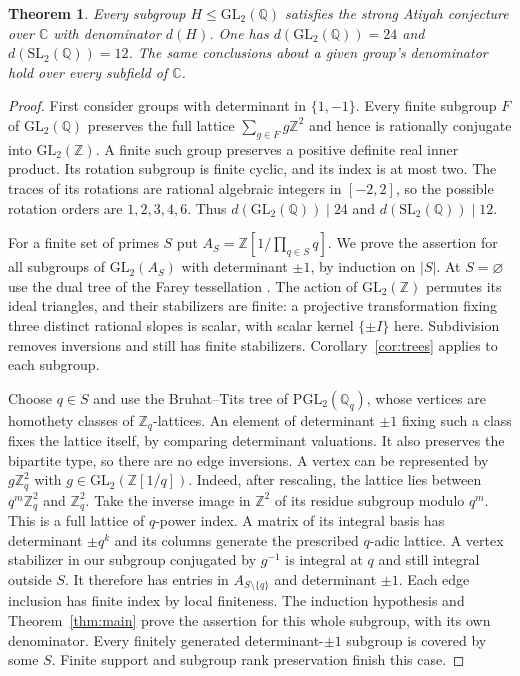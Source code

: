 \documentclass[11pt,a4paper,reqno]{amsart}
\numberwithin{equation}{section}
\newtheorem{theorem}{Theorem}[section]
\theoremstyle{remark}
\newcommand{\C}{\mathbb C}
\newcommand{\Q}{\mathbb Q}
\newcommand{\Z}{\mathbb Z}
\begin{document}
\begin{theorem}\label{thm:gl}
Every subgroup \(H\le\mathrm{GL}_2(\Q)\) satisfies the strong Atiyah conjecture over \(\C\) with denominator \(d(H)\). One has \(d(\mathrm{GL}_2(\Q))=24\) and \(d(\mathrm{SL}_2(\Q))=12\). The same conclusions about a given group's denominator hold over every subfield of \(\C\).
\end{theorem}
\begin{proof}
First consider groups with determinant in \(\{1,-1\}\). Every finite subgroup \(F\) of \(\mathrm{GL}_2(\Q)\) preserves the full lattice \(\sum_{g\in F}g\Z^2\) and hence is rationally conjugate into \(\mathrm{GL}_2(\Z)\). A finite such group preserves a positive definite real inner product. Its rotation subgroup is finite cyclic, and its index is at most two. The traces of its rotations are rational algebraic integers in \([-2,2]\), so the possible rotation orders are \(1,2,3,4,6\). Thus \(d(\mathrm{GL}_2(\Q))\mid 24\) and \(d(\mathrm{SL}_2(\Q))\mid 12\).

For a finite set of primes \(S\) put \(A_S=\Z[1/\prod_{q\in S}q]\). We prove the assertion for all subgroups of \(\mathrm{GL}_2(A_S)\) with determinant \(\pm1\), by induction on \(|S|\). At \(S=\varnothing\) use the dual tree of the Farey tessellation \cite{Serre}. The action of \(\mathrm{GL}_2(\Z)\) permutes its ideal triangles, and their stabilizers are finite: a projective transformation fixing three distinct rational slopes is scalar, with scalar kernel \(\{\pm I\}\) here. Subdivision removes inversions and still has finite stabilizers. Corollary~\ref{cor:trees} applies to each subgroup.

Choose \(q\in S\) and use the Bruhat--Tits tree of \(\mathrm{PGL}_2(\Q_q)\), whose vertices are homothety classes of \(\Z_q\)-lattices. An element of determinant \(\pm1\) fixing such a class fixes the lattice itself, by comparing determinant valuations. It also preserves the bipartite type, so there are no edge inversions. A vertex can be represented by \(g\Z_q^2\) with \(g\in\mathrm{GL}_2(\Z[1/q])\). Indeed, after rescaling, the lattice lies between \(q^m\Z_q^2\) and \(\Z_q^2\). Take the inverse image in \(\Z^2\) of its residue subgroup modulo \(q^m\). This is a full lattice of \(q\)-power index. A matrix of its integral basis has determinant \(\pm q^k\) and its columns generate the prescribed \(q\)-adic lattice. A vertex stabilizer in our subgroup conjugated by \(g^{-1}\) is integral at \(q\) and still integral outside \(S\). It therefore has entries in \(A_{S\setminus\{q\}}\) and determinant \(\pm1\). Each edge inclusion has finite index by local finiteness. The induction hypothesis and Theorem~\ref{thm:main} prove the assertion for this whole subgroup, with its own denominator. Every finitely generated determinant-\(\pm1\) subgroup is covered by some \(S\). Finite support and subgroup rank preservation finish this case.


\end{proof}
\end{document}
